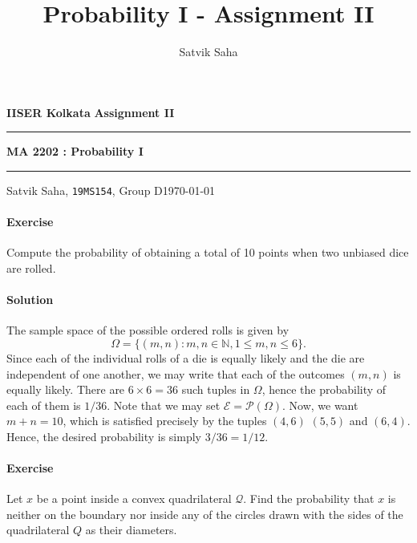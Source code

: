 \documentclass[10pt]{article}
\title{Probability I - Assignment II}
\author{Satvik Saha}
\date{}
\newcounter{prob}
\def\problem{\stepcounter{prob}\paragraph{Exercise \arabic{prob}}}
\def\solution{\paragraph{Solution}}
\begin{document}
        \par\textbf{IISER Kolkata} \hfill \textbf{Assignment II}
        \vspace{3pt}
        \hrule
        \vspace{3pt}
        \begin{center}
                \LARGE{\textbf{MA 2202 : Probability I}}
        \end{center}
        \vspace{3pt}
        \hrule
        \vspace{3pt}
        Satvik Saha, \texttt{19MS154}, Group D\hfill\today
        \vspace{20pt}

        \problem Compute the probability of obtaining a total of 10 points when two
        unbiased dice are rolled.
        
        \solution The sample space of the possible ordered rolls is given by \[
            \Omega = \{(m, n) \colon m, n \in \mathbb{N}, 1 \leq m, n \leq 6\}.
        \] Since each of the individual rolls of a die is equally likely and the die
        are independent of one another, we may write that each of the outcomes $(m,
        n)$ is equally likely. There are $6\times 6 = 36$ such tuples in $\Omega$,
        hence the probability of each of them is $1 / 36$. Note that we may set
        $\mathcal{E} = \mathcal{P}(\Omega)$. Now, we want $m + n = 10$, which is
        satisfied precisely by the tuples $(4, 6)$ $(5, 5)$ and $(6, 4)$. Hence, the
        desired probability is simply $3 / 36 = 1 / 12$.

        \problem Let $x$ be a point inside a convex quadrilateral $\mathcal{Q}$.
        Find the probability that $x$ is neither on the boundary nor inside any of
        the circles drawn with the sides of the quadrilateral $Q$ as their
        diameters.
\end{document}
